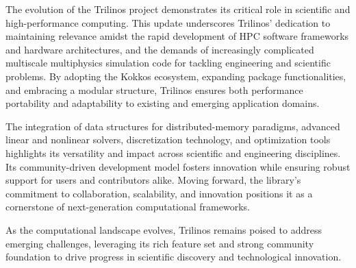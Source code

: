 
The evolution of the Trilinos project demonstrates its critical role in scientific and high-performance computing.
This update underscores Trilinos' dedication to maintaining relevance amidst the rapid development of HPC software frameworks and hardware architectures, and the demands of increasingly complicated multiscale multiphysics simulation code for tackling engineering and scientific problems.
By adopting the Kokkos ecosystem, expanding package functionalities, and embracing a modular structure,
Trilinos ensures both performance portability and adaptability to existing and emerging application domains.

The integration of data structures for distributed-memory paradigms, advanced linear and nonlinear solvers, discretization technology, and optimization tools highlights its versatility and impact across scientific and engineering disciplines.
Its community-driven development model fosters innovation while ensuring robust support for users and contributors alike.
Moving forward, the library's commitment to collaboration, scalability, and innovation positions it as a cornerstone of next-generation computational frameworks.

As the computational landscape evolves, Trilinos remains poised to address emerging challenges, leveraging its rich feature set and strong community foundation to drive progress in scientific discovery and technological innovation.